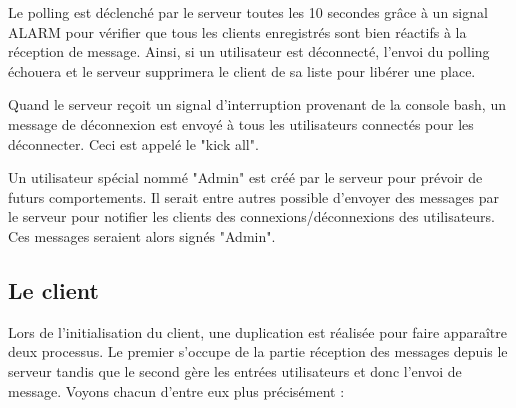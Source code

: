 \documentclass{article}
\begin{document}
	\par Le polling est déclenché par le serveur toutes les 10 secondes grâce à un signal ALARM pour vérifier que tous les clients enregistrés sont bien réactifs à la réception de message. Ainsi, si un utilisateur est déconnecté, l'envoi du polling échouera et le serveur supprimera le client de sa liste pour libérer une place.
	\par Quand le serveur reçoit un signal d'interruption provenant de la console bash, un message de déconnexion est envoyé à tous les utilisateurs connectés pour les déconnecter. Ceci est appelé le "kick all".
	\par Un utilisateur spécial nommé "Admin" est créé par le serveur pour prévoir de futurs comportements. Il serait entre autres possible d'envoyer des messages par le serveur pour notifier les clients des connexions/déconnexions des utilisateurs. Ces messages seraient alors signés "Admin".

	\subsection{Le client}
	\par Lors de l'initialisation du client, une duplication est réalisée pour faire apparaître deux processus. Le premier s'occupe de la partie réception des messages depuis le serveur tandis que le second gère les entrées utilisateurs et donc l'envoi de message. Voyons chacun d'entre eux plus précisément :
	
\end{document}
